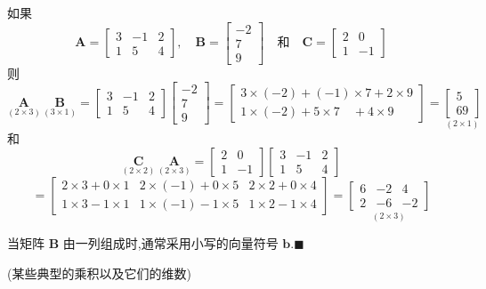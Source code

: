 如果
\[
\bm{A} =
\begin{bmatrix}
3 & -1 & 2 \\
1 & 5 & 4
\end{bmatrix},
\quad
\bm{B} =
\begin{bmatrix}
-2 \\
7 \\
9
\end{bmatrix}
\quad\text{和}\quad
\bm{C} =
\begin{bmatrix}
2 & 0 \\
1 & -1
\end{bmatrix}
\]
则
\[
\underset{(2\times 3)}{\bm{A}}\,\underset{(3\times 1)}{\bm{B}} =
\begin{bmatrix}
3 & -1 & 2 \\
1 & 5 & 4
\end{bmatrix}
\begin{bmatrix}
-2 \\
7 \\
9
\end{bmatrix}
=
\begin{bmatrix}
3\times(-2)+(-1)\times 7+2\times 9 \\
1\times(-2)+5\times 7 \quad +4\times 9
\end{bmatrix}
=
\underset{(2\times 1)}{\begin{bmatrix}
5 \\
69
\end{bmatrix}}
\]
和
\[
\underset{(2\times 2)}{\bm{C}}\,\underset{(2\times 3)}{\bm{A}} =
\begin{bmatrix}
2 & 0 \\
1 & -1
\end{bmatrix}
\begin{bmatrix}
3 & -1 & 2 \\
1 & 5 & 4
\end{bmatrix}
\]
\[
=
\begin{bmatrix}
2\times 3+0\times 1 & 2\times(-1)+0\times 5 & 2\times 2+0\times 4 \\
1\times 3-1\times 1 & 1\times(-1)-1\times 5 & 1\times 2-1\times 4
\end{bmatrix}
=
\underset{(2\times 3)}{\begin{bmatrix}
6 & -2 & 4 \\
2 & -6 & -2
\end{bmatrix}}
\]

当矩阵 $\bm{B}$ 由一列组成时,通常采用小写的向量符号 $\bm{b}$.\hfill$\blacksquare$

\quad (某些典型的乘积以及它们的维数)

